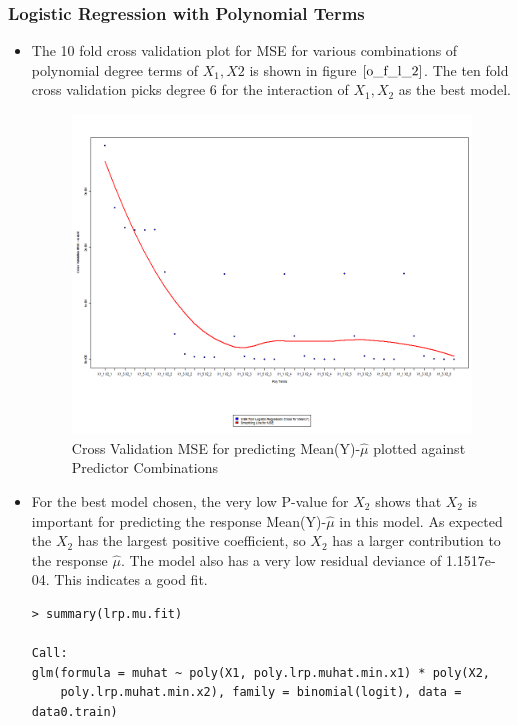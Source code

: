 \documentclass[twoside,12pt]{article}
\begin{document}
\subsubsection{Logistic Regression with Polynomial Terms}
\begin{itemize}

\item
The 10 fold cross validation plot for MSE for various combinations of polynomial degree terms of $X_1,X2$ is shown in figure $\eqref{o_f_l_2}$. The ten fold cross validation picks degree 6 for the interaction of $X_1,X_2$ as the best model. 

\FloatBarrier
\begin{figure}[!htbp]
\centering
\includegraphics[scale=.43]{images/mt_cvplot_mu_lg_poly.png} 
\caption{Cross Validation MSE for predicting Mean(Y)-$\hat{\mu}$ plotted against Predictor Combinations}
\label{o_f_l_2}
\end{figure}

\item
For the best model chosen, the very low P-value for $X_2$ shows that $X_2$ is important for predicting the response Mean(Y)-$\hat{\mu}$ in this model. As expected the $X_2$ has the largest positive coefficient, so $X_2$ has a larger contribution to the response $\hat{\mu}$. The model also has a very low residual deviance of 1.1517e-04. This indicates a good fit.
\FloatBarrier
\begin{verbatim}
> summary(lrp.mu.fit)

Call:
glm(formula = muhat ~ poly(X1, poly.lrp.muhat.min.x1) * poly(X2, 
    poly.lrp.muhat.min.x2), family = binomial(logit), data = data0.train)


\end{verbatim}
\end{itemize}
\end{document}
